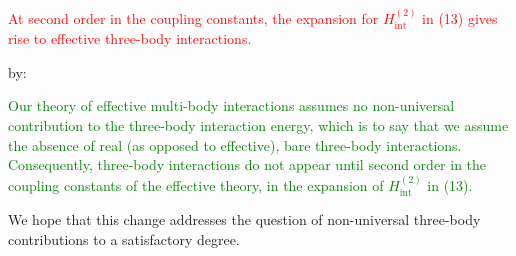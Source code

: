 \documentclass[preprint,showkeys,nofootinbib]{revtex4-1}
\renewcommand{\t}{\text} %
\newcommand{\1}{\mathds{1}}
\newcommand{\red}[1]{\textcolor{red}{#1}}
\newcommand{\green}[1]{\textcolor{green}{#1}}
\begin{document}
\begin{enumerate}
  \red{At second order in the coupling constants, the expansion for
    $H_{\t{int}}^{(2)}$ in (13) gives rise to effective three-body
    interactions.}

  by:

  \green{Our theory of effective multi-body interactions assumes no
    non-universal contribution to the three-body interaction energy,
    which is to say that we assume the absence of real (as opposed to
    effective), bare three-body interactions.  Consequently,
    three-body interactions do not appear until second order in the
    coupling constants of the effective theory, in the expansion of
    $H_{\t{int}}^{(2)}$ in (13).}

  We hope that this change addresses the question of non-universal
  three-body contributions to a satisfactory degree.

\end{enumerate}
\end{document}
